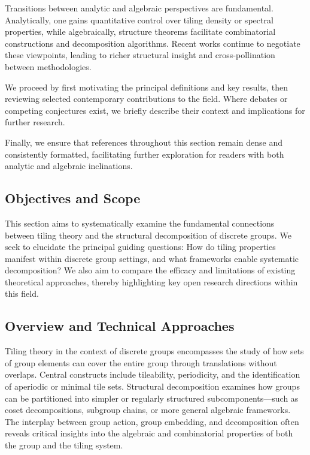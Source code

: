 \documentclass[sigconf]{acmart}
\begin{document}
Transitions between analytic and algebraic perspectives are fundamental. Analytically, one gains quantitative control over tiling density or spectral properties, while algebraically, structure theorems facilitate combinatorial constructions and decomposition algorithms. Recent works continue to negotiate these viewpoints, leading to richer structural insight and cross-pollination between methodologies.

We proceed by first motivating the principal definitions and key results, then reviewing selected contemporary contributions to the field. Where debates or competing conjectures exist, we briefly describe their context and implications for further research.

Finally, we ensure that references throughout this section remain dense and consistently formatted, facilitating further exploration for readers with both analytic and algebraic inclinations.

\subsection*{Objectives and Scope}

This section aims to systematically examine the fundamental connections between tiling theory and the structural decomposition of discrete groups. We seek to elucidate the principal guiding questions: How do tiling properties manifest within discrete group settings, and what frameworks enable systematic decomposition? We also aim to compare the efficacy and limitations of existing theoretical approaches, thereby highlighting key open research directions within this field.

\subsection*{Overview and Technical Approaches}

Tiling theory in the context of discrete groups encompasses the study of how sets of group elements can cover the entire group through translations without overlaps. Central constructs include tileability, periodicity, and the identification of aperiodic or minimal tile sets. Structural decomposition examines how groups can be partitioned into simpler or regularly structured subcomponents—such as coset decompositions, subgroup chains, or more general algebraic frameworks. The interplay between group action, group embedding, and decomposition often reveals critical insights into the algebraic and combinatorial properties of both the group and the tiling system.
\end{document}
